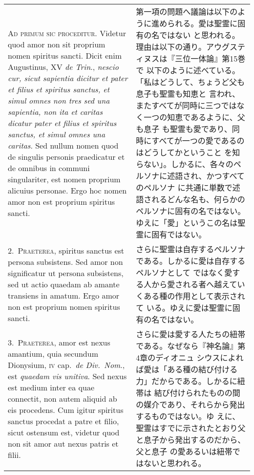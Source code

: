 \documentclass[10pt]{jsarticle} %
\begin{document}
\begin{longtable}{p{21em}p{21em}}

    {\Large A}{\scshape d primum sic proceditur}. Videtur quod amor non sit proprium nomen
spiritus sancti. Dicit enim Augustinus, XV {\itshape de Trin}., {\itshape nescio cur, sicut
sapientia dicitur et pater et filius et spiritus sanctus, et simul
omnes non tres sed una sapientia, non ita et caritas dicatur pater et
filius et spiritus sanctus, et simul omnes una caritas}. Sed nullum
nomen quod de singulis personis praedicatur et de omnibus in communi
singulariter, est nomen proprium alicuius personae. Ergo hoc nomen
amor non est proprium spiritus sancti.


&

第一項の問題へ議論は以下のように進められる。愛は聖霊に固有の名ではない
と思われる。理由は以下の通り。アウグスティヌスは『三位一体論』第15巻で
以下のように述べている。「私はどうして、ちょうど父も息子も聖霊も知恵と
言われ、またすべてが同時に三つではなく一つの知恵であるように、父も息子
も聖霊も愛であり、同時にすべてが一つの愛であるのはどうしてかということ
を知らない」。しかるに、各々のペルソナに述語され、かつすべてのペルソナ
に共通に単数で述語されるどんな名も、何らかのペルソナに固有の名ではない。
ゆえに「愛」というこの名は聖霊に固有ではない。


\\



2.~{\scshape Praeterea}, spiritus sanctus est persona subsistens. Sed amor non
significatur ut persona subsistens, sed ut actio quaedam ab amante
transiens in amatum. Ergo amor non est proprium nomen spiritus sancti.


&

さらに聖霊は自存するペルソナである。しかるに愛は自存するペルソナとして
ではなく愛する人から愛される者へ越えていくある種の作用として表示されて
いる。ゆえに愛は聖霊に固有の名ではない。

\\



3.~{\scshape Praeterea}, amor est nexus amantium, quia secundum Dionysium, {\scshape iv}
cap.~{\itshape de Div.~Nom}., est {\itshape quaedam vis unitiva}. Sed nexus est medium inter
ea quae connectit, non autem aliquid ab eis procedens. Cum igitur
spiritus sanctus procedat a patre et filio, sicut ostensum est,
videtur quod non sit amor aut nexus patris et filii.


&

さらに愛は愛する人たちの紐帯である。なぜなら『神名論』第4章のディオニュ
シウスによれば愛は「ある種の結び付ける力」だからである。しかるに紐帯は
結び付けられたものの間の媒介であり、それらから発出するものではない。ゆ
えに、聖霊はすでに示されたとおり父と息子から発出するのだから、父と息子
の愛あるいは紐帯ではないと思われる。


\end{longtable}
\end{document}
